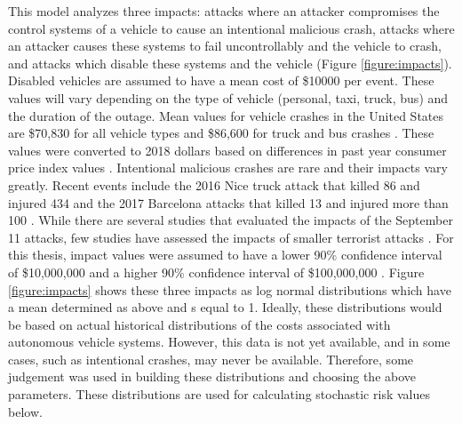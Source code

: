\documentclass{article}
\newtheorem{assumption}{Assumption}
\begin{document}
This model analyzes three impacts: attacks where an attacker compromises the control systems of a vehicle to cause an intentional malicious crash, attacks where an attacker causes these systems to fail uncontrollably and the vehicle to crash, and attacks which disable these systems and the vehicle (Figure \ref{figure:impacts}). Disabled vehicles are assumed to have a mean cost of \$10000 per event. These values will vary depending on the type of vehicle (personal, taxi, truck, bus) and the duration of the outage. Mean values for vehicle crashes in the United States are \$70,830 for all vehicle types \citep{blincoe_economic_2015} and \$86,600 for truck and bus crashes \citep{zaloshnja_costs_2004}. These values were converted to 2018 dollars based on differences in past year consumer price index values \citep{bureau_of_labor_statistics_cpi-all_2018}. Intentional malicious crashes are rare and their impacts vary greatly. Recent events include the 2016 Nice truck attack that killed 86 and injured 434 and the 2017 Barcelona attacks that killed 13 and injured more than 100 \citep{le_monde.fr_with_afp_bilan_2016, smith-spark_deadly_2017}. While there are several studies that evaluated the impacts of the September 11 attacks, few studies have assessed the impacts of smaller terrorist attacks \citep{jackson_impact_2008, blalock_impact_2005}. For this thesis, impact values were assumed to have a lower 90\% confidence interval of \$10,000,000 and a higher 90\% confidence interval of \$100,000,000 \citep{hubbard_how_2016}. Figure \ref{figure:impacts} shows these three impacts as log normal distributions which have a mean determined as above and s equal to 1. Ideally, these distributions would be based on actual historical distributions of the costs associated with autonomous vehicle systems. However, this data is not yet available, and in some cases, such as intentional crashes, may never be available. Therefore, some judgement was used in building these distributions and choosing the above parameters. These distributions are used for calculating stochastic risk values below.

\end{document}
